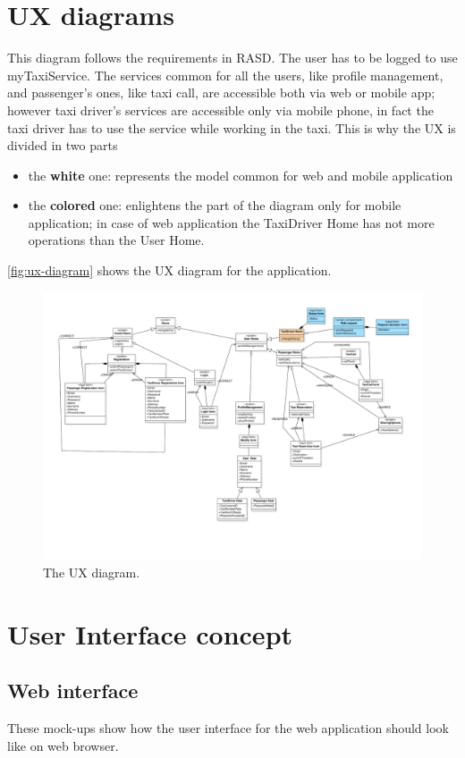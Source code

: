 \section{UX diagrams}
This diagram follows the requirements in RASD. 
The user has to be logged to use myTaxiService. 
The services common for all the users, like profile management, and passenger's ones, like taxi call, are accessible both via web or mobile app; however taxi driver's services are accessible only via mobile phone, in fact the taxi driver has to use the service while working in the taxi.
This is why the UX is divided in two parts 
\begin{itemize}
\item the {\bf white} one: represents the model common for web and mobile application
\item the {\bf colored} one: enlightens the part of the diagram only for mobile application; in case of web application the TaxiDriver Home has not more operations than the User Home.
\end{itemize}
\autoref{fig:ux-diagram} shows the UX diagram for the application.

\begin{figure}[h]
\centering
\includegraphics[width=\textwidth]{diagrams/UXdiagramSE2}
\caption{The UX diagram.}
\label{fig:ux-diagram}
\end{figure}

\FloatBarrier
\section{User Interface concept}

\subsection{Web interface}
These mock-ups show how the user interface for the web application should look like on web browser.

